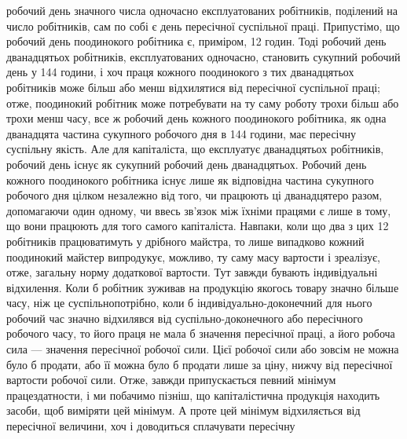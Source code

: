 робочий день значного числа одночасно експлуатованих робітників, поділений на число робітників, сам
по собі є день пересічної суспільної праці. Припустімо, що робочий день поодинокого робітника є,
приміром, 12 годин. Тоді робочий день дванадцятьох робітників, експлуатованих одночасно, становить
сукупний робочий день у 144 години, і хоч праця кожного поодинокого
з тих дванадцятьох робітників може більш або менш відхилятися від пересічної суспільної праці; отже,
поодинокий робітник
може потребувати на ту саму роботу трохи більш або трохи менш
часу, все ж робочий день кожного поодинокого робітника, як
одна дванадцята частина сукупного робочого дня в 144 години,
має пересічну суспільну якість. Але для капіталіста, що експлуатує дванадцятьох робітників, робочий
день існує як сукупний
робочий день дванадцятьох. Робочий день кожного поодинокого
робітника існує лише як відповідна частина сукупного робочого
дня цілком незалежно від того, чи працюють ці дванадцятеро
разом, допомагаючи один одному, чи ввесь зв’язок між їхніми
працями є лише в тому, що вони працюють для того самого капіталіста. Навпаки, коли що два з цих 12
робітників працюватимуть
у дрібного майстра, то лише випадково кожний поодинокий майстер випродукує, можливо, ту саму масу
вартости і зреалізує,
отже, загальну норму додаткової вартости. Тут завжди бувають
індивідуальні відхилення. Коли б робітник зуживав на продукцію якогось товару значно більше часу,
ніж це суспільнопотрібно, коли б індивідуально-доконечний для нього робочий
час значно відхилявся від суспільно-доконечного або пересічного
робочого часу, то його праця не мала б значення пересічної праці,
а його робоча сила — значення пересічної робочої сили. Цієї робочої сили або зовсім не можна було б
продати, або її можна було б
продати лише за ціну, нижчу від пересічної вартости робочої сили.
Отже, завжди припускається певний мінімум працездатности, і ми
побачимо пізніш, що капіталістична продукція находить засоби,
щоб виміряти цей мінімум. А проте цей мінімум відхиляється
від пересічної величини, хоч і доводиться сплачувати пересічну

